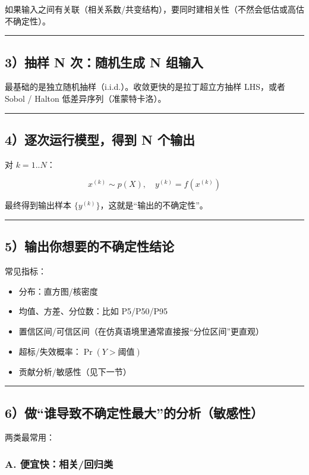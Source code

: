 如果输入之间有关联（相关系数/共变结构），要同时建相关性（不然会低估或高估不确定性）。

\hrule

\subsection{3）抽样 N 次：随机生成 N 组输入}

最基础的是独立随机抽样（i.i.d.）。收敛更快的是拉丁超立方抽样 LHS，或者 Sobol / Halton 低差异序列（准蒙特卡洛）。

\hrule

\subsection{4）逐次运行模型，得到 N 个输出}

对 \(k=1..N\)：

\[
x^{(k)} \sim p(X),\quad y^{(k)} = f(x^{(k)})
\]

最终得到输出样本 \(\{y^{(k)}\}\)，这就是“输出的不确定性”。

\hrule

\subsection{5）输出你想要的不确定性结论}

常见指标：

\begin{itemize}
  \item 分布：直方图/核密度
  \item 均值、方差、分位数：比如 P5/P50/P95
  \item 置信区间/可信区间（在仿真语境里通常直接报“分位区间”更直观）
  \item 超标/失效概率：\(\Pr(Y>阈值)\)
  \item 贡献分析/敏感性（见下一节）
\end{itemize}

\hrule

\subsection{6）做“谁导致不确定性最大”的分析（敏感性）}

两类最常用：

\subsubsection{A. 便宜快：相关/回归类}

